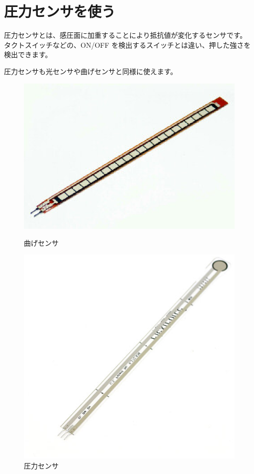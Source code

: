 \documentclass[11pt,a4paper]{jarticle}
\begin{document}
\newpage

\section{圧力センサを使う}
圧力センサとは、感圧面に加重することにより抵抗値が変化するセンサです。
タクトスイッチなどの、ON/OFF を検出するスイッチとは違い、押した強さを検出できます。


圧力センサも光センサや曲げセンサと同様に使えます。

\begin{figure}[htbp]
 \begin{minipage}{0.5\columnwidth}
  \centering
  \includegraphics[width=\columnwidth]{img/flex_sensor.eps}
  \caption{曲げセンサ}
 \end{minipage}
 \begin{minipage}{0.5\columnwidth}
  \centering
  \includegraphics[width=\columnwidth]{img/pressure_sensor.eps}
  \caption{圧力センサ}
 \end{minipage}
\end{figure}
\end{document}
